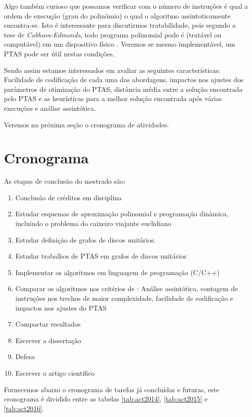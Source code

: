 Algo também curioso que possamos verificar com o número de instruções é qual a ordem de execução (grau do polinômio) o qual o algoritmo assintoticamente encontra-se. Isto é interessante para discutirmos tratabilidade, pois segundo a tese de \textit{Cobham-Edmonds}, todo programa polinomial pode é (tratável ou computável) em um dispositivo físico \cite{homer}. Veremos se mesmo implementável, um PTAS pode ser útil nestas condições.

Sendo assim estamos interessados em avaliar as seguintes características: Facilidade de codificação de cada uma das abordagens, impactos nos ajustes dos parâmetros de otimização do PTAS, distância média entre a solução encontrada pelo PTAS e as heurísticas para a melhor solução encontrada após várias execuções e análise assintótica.

Veremos na próxima seção o cronograma de atividades.

\section{Cronograma}
\label{sec:cronograma}

As etapas de conclusão do mestrado são:

\begin{enumerate}
\item Conclusão de créditos em disciplina
\item Estudar esquemas de aproximação polinomial e programação dinâmica, incluindo o problema do caixeiro viajante euclidiano
\item Estudar definição de grafos de discos unitários.
\item Estudar trabalhos de PTAS em grafos de discos unitários
\item Implementar os algoritmos em linguagem de programação (C/C++)
\item Comparar os algoritmos nos critérios de : Análise assintótica, contagem de instruções nos trechos de maior complexidade, facilidade de codificação e impactos nos ajustes do PTAS
\item Compactar resultados
\item Escrever a dissertação
\item Defesa
\item Escrever o artigo científico
\end{enumerate}

Fornecemos abaixo o cronograma de tarefas já concluídas e futuras, este cronograma é dividido entre as tabelas \ref{tab:act2014}, \ref{tab:act2015} e \ref{tab:act2016}.

